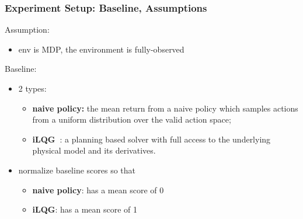 \begin{frame}
\frametitle{Experiment Setup: Baseline, Assumptions}

Assumption:
\begin{itemize}
  \item env is MDP, the environment is fully-observed
\end{itemize}

Baseline:
\begin{itemize}
  \item 2 types:
  \begin{itemize}
    \item \textbf{naive policy:} the mean return from a naive policy which samples actions from
    a uniform distribution over the valid action space;
    \item \textbf{iLQG~\cite{Todorov2005}}: a planning based solver with full access to
    the underlying physical model and its derivatives.
  \end{itemize}
  \item normalize baseline scores so that
    \begin{itemize}
    \item \textbf{naive policy}: has a mean score of 0
    \item \textbf{iLQG}: has a mean score of 1
  \end{itemize}
\end{itemize}

\end{frame}

